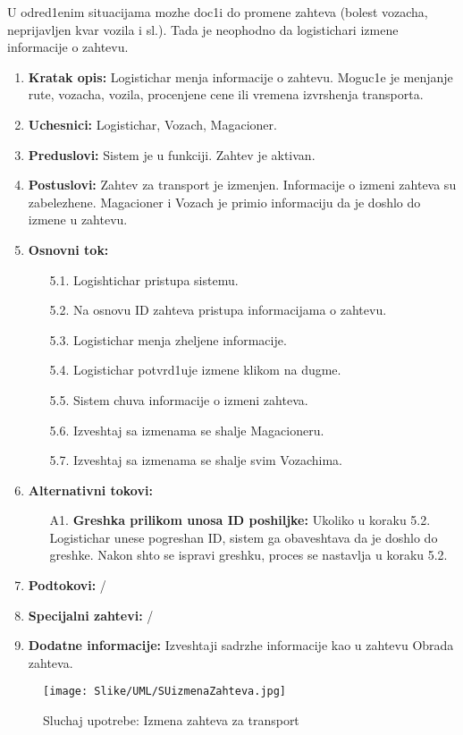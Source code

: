 
U odred1enim situacijama mozhe doc1i do promene zahteva (bolest vozacha, neprijavljen kvar vozila i sl.). Tada je neophodno da logistichari izmene informacije o zahtevu.

\begin{enumerate}
    \item \textbf{Kratak opis:} Logistichar menja informacije o zahtevu. Moguc1e je menjanje rute, vozacha, vozila, procenjene cene ili vremena izvrshenja transporta. 
    
    \item \textbf{Uchesnici:} Logistichar, Vozach, Magacioner.
    \item \textbf{Preduslovi:} Sistem je u funkciji. Zahtev je aktivan.
    \item \textbf{Postuslovi:} Zahtev za transport je izmenjen. Informacije o izmeni zahteva su zabelezhene. Magacioner i Vozach je primio informaciju da je doshlo do izmene u zahtevu.
    \item \textbf{Osnovni tok:}
        \begin{enumerate}
            \item[5.1.] Logishtichar pristupa sistemu. 
            \item[5.2.] Na osnovu ID zahteva pristupa informacijama o zahtevu.
            
            \item[5.3.] Logistichar menja zheljene informacije. 
            \item[5.4.] Logistichar potvrd1uje izmene klikom na dugme.
            
            \item[5.5.] Sistem chuva informacije o izmeni zahteva.
            \item[5.6.] Izveshtaj sa izmenama se shalje Magacioneru.
            \item[5.7.] Izveshtaj sa izmenama se shalje svim Vozachima.
            
        \end{enumerate}
    \item \textbf{Alternativni tokovi:}
            \begin{enumerate}
                \item [A1.] \textbf{Greshka prilikom unosa ID poshiljke: }
                Ukoliko u koraku 5.2. Logistichar unese pogreshan ID, sistem ga obaveshtava da je doshlo do greshke. 
                Nakon shto se ispravi greshku, proces se nastavlja u koraku 5.2.
            \end{enumerate}
        
    \item \textbf{Podtokovi:} /
    \item \textbf{Specijalni zahtevi:} /
    \item \textbf{Dodatne informacije:} Izveshtaji sadrzhe informacije kao u zahtevu Obrada zahteva.
    
\end{enumerate}



\begin{figure}[H]
    \texttt{[image: Slike/UML/SUizmenaZahteva.jpg]}
    \centering
    \caption{Sluchaj upotrebe: Izmena zahteva za transport}
    \label{dsizmena}
\end{figure}    

\newpage


